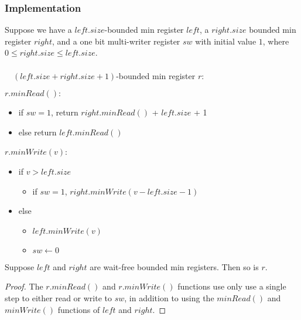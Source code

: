 \documentclass{beamer}
\begin{document}
\begin{frame}
\frametitle{Implementation}
	Suppose we have a $left.size$-bounded min register $left$, a $right.size$ bounded min register $right$, 
	and a one bit multi-writer register $sw$ with initial value $1$,
	where $0 \le right.size \le left.size$.
	\\~\
	\\~\
	\noindent $(left.size + right.size + 1)$-bounded min register $r$:

	$r.minRead():$
			\begin{itemize}
				\item if $sw = 1$, return $right.minRead()$ + $left.size$ + 1 
				\item else return $left.minRead()$
			\end{itemize} 
		$r.minWrite(v)$:
			\begin{itemize}
				\item if $v > left.size$
				\begin{itemize}
					\item if $sw = 1$, $right.minWrite(v - left.size - 1)$
				\end{itemize}
				\item else
				\begin{itemize}
					\item $left.minWrite(v)$
					\item $sw \leftarrow 0$
				\end{itemize}
			\end{itemize}
\end{frame}
\begin{frame}
	\begin{lemma}
	Suppose $left$ and $right$ are wait-free bounded min registers. Then so is $r$.
	\end{lemma}
	\begin{proof}
		The $r.minRead()$ and $r.minWrite()$ functions use only use a single step to either read or write to $sw$, in addition to using 
		the $minRead()$ and $minWrite()$ functions of $left$ and $right$. 
	\end{proof}
\end{frame}
\end{document}
